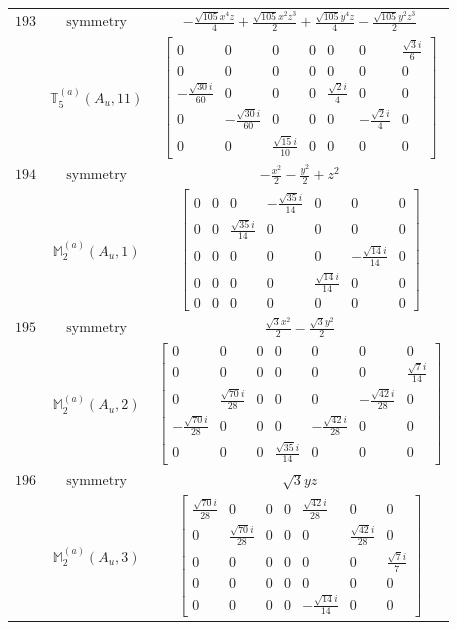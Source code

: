 \documentclass[fleqn,8pt,landscape]{jsarticle}
\begin{document}
\begin{longtable}{ccc}
$ 193 $ & $ \text{symmetry} $ & $ - \frac{\sqrt{105} x^{4} z}{4} + \frac{\sqrt{105} x^{2} z^{3}}{2} + \frac{\sqrt{105} y^{4} z}{4} - \frac{\sqrt{105} y^{2} z^{3}}{2} $ \\
$  $ & $ \mathbb{T}_{5}^{(a)}(A_{u},11) $ & $ \begin{bmatrix} 0 & 0 & 0 & 0 & 0 & 0 & \frac{\sqrt{3} i}{6} \\ 0 & 0 & 0 & 0 & 0 & 0 & 0 \\ - \frac{\sqrt{30} i}{60} & 0 & 0 & 0 & \frac{\sqrt{2} i}{4} & 0 & 0 \\ 0 & - \frac{\sqrt{30} i}{60} & 0 & 0 & 0 & - \frac{\sqrt{2} i}{4} & 0 \\ 0 & 0 & \frac{\sqrt{15} i}{10} & 0 & 0 & 0 & 0 \end{bmatrix} $ \\ \hline
$ 194 $ & $ \text{symmetry} $ & $ - \frac{x^{2}}{2} - \frac{y^{2}}{2} + z^{2} $ \\
$  $ & $ \mathbb{M}_{2}^{(a)}(A_{u},1) $ & $ \begin{bmatrix} 0 & 0 & 0 & - \frac{\sqrt{35} i}{14} & 0 & 0 & 0 \\ 0 & 0 & \frac{\sqrt{35} i}{14} & 0 & 0 & 0 & 0 \\ 0 & 0 & 0 & 0 & 0 & - \frac{\sqrt{14} i}{14} & 0 \\ 0 & 0 & 0 & 0 & \frac{\sqrt{14} i}{14} & 0 & 0 \\ 0 & 0 & 0 & 0 & 0 & 0 & 0 \end{bmatrix} $ \\ \hline
$ 195 $ & $ \text{symmetry} $ & $ \frac{\sqrt{3} x^{2}}{2} - \frac{\sqrt{3} y^{2}}{2} $ \\
$  $ & $ \mathbb{M}_{2}^{(a)}(A_{u},2) $ & $ \begin{bmatrix} 0 & 0 & 0 & 0 & 0 & 0 & 0 \\ 0 & 0 & 0 & 0 & 0 & 0 & \frac{\sqrt{7} i}{14} \\ 0 & \frac{\sqrt{70} i}{28} & 0 & 0 & 0 & - \frac{\sqrt{42} i}{28} & 0 \\ - \frac{\sqrt{70} i}{28} & 0 & 0 & 0 & - \frac{\sqrt{42} i}{28} & 0 & 0 \\ 0 & 0 & 0 & \frac{\sqrt{35} i}{14} & 0 & 0 & 0 \end{bmatrix} $ \\ \hline
$ 196 $ & $ \text{symmetry} $ & $ \sqrt{3} y z $ \\
$  $ & $ \mathbb{M}_{2}^{(a)}(A_{u},3) $ & $ \begin{bmatrix} \frac{\sqrt{70} i}{28} & 0 & 0 & 0 & \frac{\sqrt{42} i}{28} & 0 & 0 \\ 0 & \frac{\sqrt{70} i}{28} & 0 & 0 & 0 & \frac{\sqrt{42} i}{28} & 0 \\ 0 & 0 & 0 & 0 & 0 & 0 & \frac{\sqrt{7} i}{7} \\ 0 & 0 & 0 & 0 & 0 & 0 & 0 \\ 0 & 0 & 0 & 0 & - \frac{\sqrt{14} i}{14} & 0 & 0 \end{bmatrix} $ \\ \hline

\end{longtable}
\end{document}
